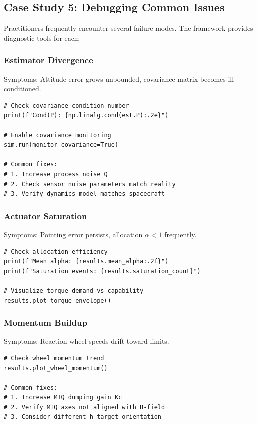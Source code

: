 \documentclass[conference]{IEEEtran}
\begin{document}
\subsection{Case Study 5: Debugging Common Issues}\label{subsec:case5}

Practitioners frequently encounter several failure modes. The framework provides diagnostic tools for each:

\subsubsection{Estimator Divergence}
Symptoms: Attitude error grows unbounded, covariance matrix becomes ill-conditioned.

\begin{lstlisting}[caption={Diagnosing estimator divergence}]
# Check covariance condition number
print(f"Cond(P): {np.linalg.cond(est.P):.2e}")

# Enable covariance monitoring
sim.run(monitor_covariance=True)

# Common fixes:
# 1. Increase process noise Q
# 2. Check sensor noise parameters match reality
# 3. Verify dynamics model matches spacecraft
\end{lstlisting}

\subsubsection{Actuator Saturation}
Symptoms: Pointing error persists, allocation $\alpha < 1$ frequently.

\begin{lstlisting}[caption={Diagnosing actuator saturation}]
# Check allocation efficiency
print(f"Mean alpha: {results.mean_alpha:.2f}")
print(f"Saturation events: {results.saturation_count}")

# Visualize torque demand vs capability
results.plot_torque_envelope()
\end{lstlisting}

\subsubsection{Momentum Buildup}
Symptoms: Reaction wheel speeds drift toward limits.

\begin{lstlisting}[caption={Diagnosing momentum buildup}]
# Check wheel momentum trend
results.plot_wheel_momentum()

# Common fixes:
# 1. Increase MTQ dumping gain Kc
# 2. Verify MTQ axes not aligned with B-field
# 3. Consider different h_target orientation
\end{lstlisting}
\end{document}
